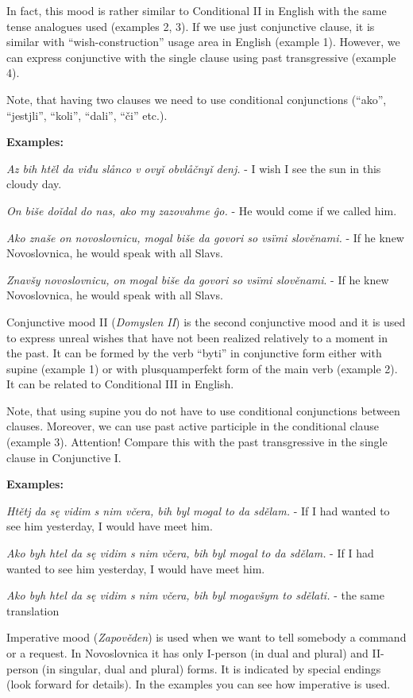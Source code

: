In fact, this mood is rather similar to Conditional II in English with the same tense analogues used (examples 2, 3). If we use just conjunctive clause, it is similar with “wish-construction” usage area in English (example 1). However, we can express conjunctive with the single clause using past transgressive (example 4).

Note, that having two clauses we need to use conditional conjunctions (“ako”, “jestjli”, “koli”, “dali”, “či” etc.).

\textbf{Examples:}

\textit{Az bih htěl da viđu slånco v ovyǐ obvlåčnyǐ denj.} - I wish I see the sun in this cloudy day.

\textit{On biše doǐdal do nas, ako my zazovahme ĝo.} - He would come if we called him.

\textit{Ako znaše on novoslovnicu, mogal biše da govori so vsïmi slověnami.} - If he knew Novoslovnica, he would speak with all Slavs.

\textit{Znavšy novoslovnicu, on mogal biše da govori so vsïmi slověnami}. - If he knew Novoslovnica, he would speak with all Slavs.

Conjunctive mood II (\textit{Domyslen II}) is the second conjunctive mood and it is used to express unreal wishes that have not been realized relatively to a moment in the past. It can be formed by the verb “byti” in conjunctive form either  with supine (example 1) or with plusquamperfekt form of the main verb (example 2). It can be related to Conditional III in English. 

Note, that using supine you do not have to use conditional conjunctions between clauses. Moreover, we can use past active participle in the conditional clause (example 3). Attention! Compare this with the past transgressive in the single clause in Conjunctive I.

\textbf{Examples:}

\textit{Htětj da sę vidim s nim včera, bih byl mogal to da sdělam.} - If  I had wanted to see him yesterday, I would have meet him.

\textit{Ako byh htel da sę vidim s nim včera, bih byl mogal to da sdělam.} - If  I had wanted to see him yesterday, I would have meet him.

\textit{Ako byh htel da sę vidim s nim včera, bih byl mogavšym to sdělati.} - the same translation

Imperative mood (\textit{Zapověden})  is used when we want to tell somebody a command or a request. In Novoslovnica it has only I-person (in dual and plural) and II-person (in singular, dual and plural) forms. It is indicated by special endings (look forward for details). In the examples you can see how imperative is used.

